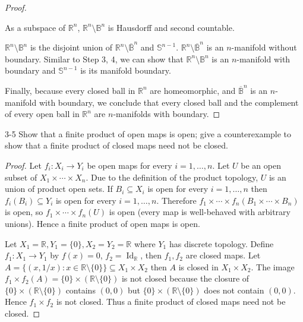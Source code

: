 \begin{proof}
\begin{enumerate}[label={\textbf{Step \arabic*.}},itemindent=1cm]
		      As a subspace of $\mathbb{R}^{n}$, $\mathbb{R}^{n}\setminus \mathbb{B}^{n}$ is Hausdorff and second countable.

		      $\mathbb{R}^{n}\setminus\mathbb{B}^{n}$ is the disjoint union of $\mathbb{R}^{n}\setminus\overline{\mathbb{B}}^{n}$ and $\mathbb{S}^{n-1}$. $\mathbb{R}^{n}\setminus\overline{\mathbb{B}}^{n}$ is an $n$-manifold without boundary. Similar to Step 3, 4, we can show that $\mathbb{R}^{n}\setminus \mathbb{B}^{n}$ is an $n$-manifold with boundary and $\mathbb{S}^{n-1}$ is its manifold boundary.
	\end{enumerate}

	Finally, because every closed ball in $\mathbb{R}^{n}$ are homeomorphic, and $\overline{\mathbb{B}}^{n}$ is an $n$-manifold with boundary, we conclude that every closed ball and the complement of every open ball in $\mathbb{R}^{n}$ are $n$-manifolds with boundary.
\end{proof}

\begin{problem}{3-5}
Show that a finite product of open maps is open; give a counterexample to show that a finite product of closed maps need not be closed.
\end{problem}

\begin{proof}
	Let $f_{i}: X_{i}\to Y_{i}$ be open maps for every $i = 1,\ldots,n$. Let $U$ be an open subset of $X_{1}\times\cdots\times X_{n}$. Due to the definition of the product topology, $U$ is an union of product open sets. If $B_{i}\subseteq X_{i}$ is open for every $i = 1,\ldots,n$ then $f_{i}(B_{i})\subseteq Y_{i}$ is open for every $i = 1,\ldots,n$. Therefore $f_{1}\times\cdots\times f_{n}(B_{1}\times\cdots\times B_{n})$ is open, so $f_{1}\times\cdots\times f_{n}(U)$ is open (every map is well-behaved with arbitrary unions). Hence a finite product of open maps is open.

	Let $X_{1} = \mathbb{R}, Y_{1} = \{ 0 \}, X_{2} = Y_{2} = \mathbb{R}$ where $Y_{1}$ has discrete topology. Define $f_{1}: X_{1}\to Y_{1}$ by $f(x) = 0$, $f_{2} = \operatorname{Id}_{\mathbb{R}}$, then $f_{1}, f_{2}$ are closed maps. Let $A = \{ (x, 1/x): x\in\mathbb{R}\setminus\{0\} \}\subseteq X_{1}\times X_{2}$ then $A$ is closed in $X_{1}\times X_{2}$. The image $f_{1}\times f_{2}(A) = \{ 0 \}\times (\mathbb{R}\setminus\{0\})$ is not closed because the closure of $\{ 0 \}\times (\mathbb{R}\setminus\{0\})$ contains $(0, 0)$ but $\{ 0 \}\times (\mathbb{R}\setminus\{0\})$ does not contain $(0, 0)$. Hence $f_{1}\times f_{2}$ is not closed. Thus a finite product of closed maps need not be closed.
\end{proof}

